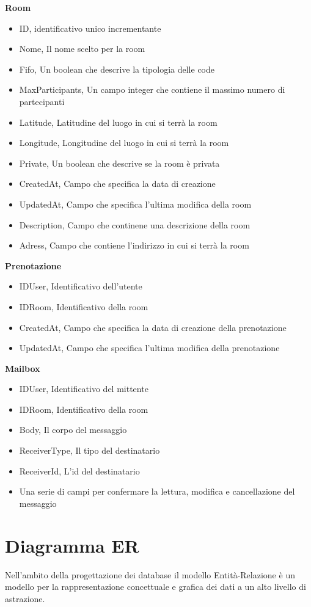 \textbf{Room}
\begin{itemize}
	\item ID, identificativo unico incrementante
	\item Nome, Il nome scelto per la room
	\item Fifo, Un boolean che descrive la tipologia delle code
	\item MaxParticipants, Un campo integer che contiene il massimo numero di partecipanti
	\item Latitude, Latitudine del luogo in cui si terrà la room
	\item Longitude, Longitudine del luogo in cui si terrà la room
	\item Private, Un boolean che descrive se la room è privata
	\item CreatedAt, Campo che specifica la data di creazione
	\item UpdatedAt, Campo che specifica l'ultima modifica della room
	\item Description, Campo che continene una descrizione della room
	\item Adress, Campo che contiene l'indirizzo in cui si terrà la room
\end{itemize}

\textbf{Prenotazione}
\begin{itemize}
	\item IDUser, Identificativo dell'utente
	\item IDRoom, Identificativo della room
	\item CreatedAt, Campo che specifica la data di creazione della prenotazione
	\item UpdatedAt, Campo che specifica l'ultima modifica della prenotazione
\end{itemize}

\textbf{Mailbox}
\begin{itemize}
	\item IDUser, Identificativo del mittente
	\item IDRoom, Identificativo della room
	\item Body, Il corpo del messaggio
	\item ReceiverType, Il tipo del destinatario
	\item ReceiverId, L'id del destinatario
	\item Una serie di campi per confermare la lettura, modifica e cancellazione del messaggio
\end{itemize}

\section{Diagramma ER}
Nell'ambito della progettazione dei database il modello Entità-Relazione è un modello per la rappresentazione concettuale e grafica dei dati a un alto livello di astrazione.

